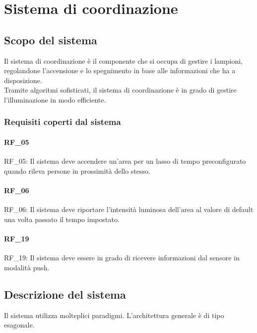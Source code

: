 \chapter{Sistema di coordinazione}\label{cap:sistema-coordinazione}

\section{Scopo del sistema}
Il sistema di coordinazione è il componente che si occupa di gestire i lampioni, regolandone l'accensione e lo spegnimento in base alle informazioni che ha a disposizione.\\

Tramite algoritmi sofisticati, il sistema di coordinazione è in grado di gestire l'illuminazione in modo efficiente.

\subsection{Requisiti coperti dal sistema}

\subsubsection{RF\_05}

RF\_05: Il sistema deve accendere un'area per un lasso di tempo preconfigurato quando rileva persone in prossimità dello stesso.

\subsubsection{RF\_06}

RF\_06: Il sistema deve riportare l'intensità luminosa dell'area al valore di default una volta passato il tempo impostato.

\subsubsection{RF\_19}

RF\_19: Il sistema deve essere in grado di ricevere informazioni dal sensore in modalità push.

\section{Descrizione del sistema}

Il sistema utilizza molteplici paradigmi. L'architettura generale è di tipo esagonale.

